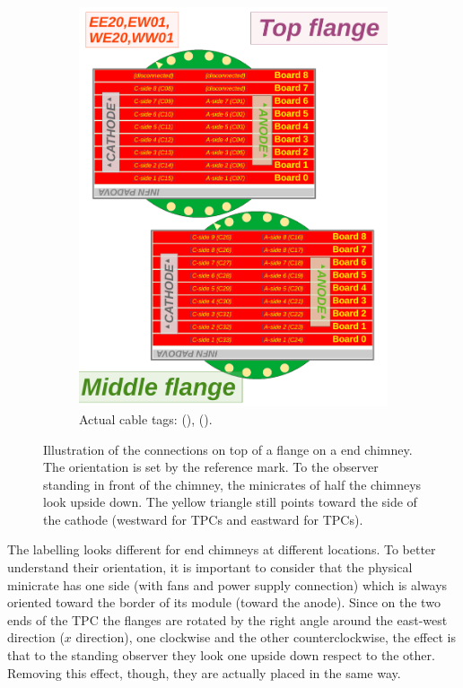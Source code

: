 \begin{figure}
\begin{subfigure}{0.45\linewidth}
    \includegraphics[width=\textwidth]{figures/CornerFlangesAndMinicrate_downward}
    \caption{Actual cable tags:  (),  ().}
    \label{fig:FlangeConnectionsCorner_downward}
  \end{subfigure}
  \caption{
    Illustration of the connections on top of a flange on a end chimney.
    The orientation is set by the reference mark.
    To the observer standing in front of the chimney,
    the minicrates of half the chimneys look upside down.
    The yellow triangle still points toward the side of the cathode
    (\ie westward for  TPCs and eastward for  TPCs).
  }
  \label{fig:FlangeConnectionsCorner}
\end{figure}

The labelling looks different for end chimneys at different locations.
To better understand their orientation,
it is important to consider that the physical minicrate has one side
(with fans and power supply connection) which is always oriented toward the border of its module (\ie toward the anode).
Since on the two ends of the TPC the flanges are rotated by the right angle around the east-west direction ($x$ direction),
one clockwise and the other counterclockwise,
the effect is that to the standing observer they look one upside down respect to the other.
Removing this effect, though, they are actually placed in the same way.



